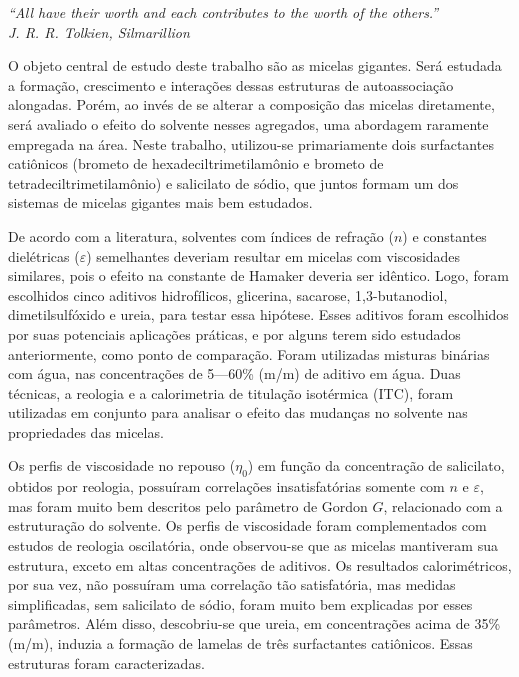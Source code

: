 \documentclass[
	12pt,				%
	oneside,
	a4paper,			%
	english,			%
	brazil%
	]{abntex2}
\begin{document}
\begin{epigrafe}
    \vspace*{\fill}
	\begin{flushright}
		\textit{``All have their worth and each contributes to the worth of the others.'' \\ J. R. R. Tolkien, Silmarillion}
	\end{flushright}
\end{epigrafe}


\setlength{\absparsep}{18pt} %
\begin{resumo}
 	O objeto central de estudo deste trabalho são as micelas gigantes. Será estudada a formação, crescimento e interações dessas estruturas de autoassociação alongadas. Porém, ao invés de se alterar a composição das micelas diretamente, será avaliado o efeito do solvente nesses agregados, uma abordagem raramente empregada na área. Neste trabalho, utilizou-se primariamente dois surfactantes catiônicos (brometo de hexadeciltrimetilamônio e brometo de tetradeciltrimetilamônio) e salicilato de sódio, que juntos formam um dos sistemas de micelas gigantes mais bem estudados.
 	
	De acordo com a literatura, solventes com índices de refração (\(n\)) e constantes dielétricas (\(\varepsilon\)) semelhantes deveriam resultar em micelas com viscosidades similares, pois o efeito na constante de Hamaker deveria ser idêntico. Logo, foram escolhidos cinco aditivos hidrofílicos, glicerina, sacarose, 1,3-butanodiol, dimetilsulfóxido e ureia, para testar essa hipótese. Esses aditivos foram escolhidos por suas potenciais aplicações práticas, e por alguns terem sido estudados anteriormente, como ponto de comparação. Foram utilizadas misturas binárias com água, nas concentrações de 5---60\% (m/m) de aditivo em água. Duas técnicas, a reologia e a calorimetria de titulação isotérmica (ITC), foram utilizadas em conjunto para analisar o efeito das mudanças no solvente nas propriedades das micelas. 
	
	Os perfis de viscosidade no repouso (\(\eta_0\)) em função da concentração de salicilato, obtidos por reologia, possuíram correlações insatisfatórias somente com \(n\) e \(\varepsilon\), mas foram muito bem descritos pelo parâmetro de Gordon \(G\), relacionado com a estruturação do solvente. Os perfis de viscosidade foram complementados com estudos de reologia oscilatória, onde observou-se que as micelas mantiveram sua estrutura, exceto em altas concentrações de aditivos. Os resultados calorimétricos, por sua vez, não possuíram uma correlação tão satisfatória, mas medidas simplificadas, sem salicilato de sódio, foram muito bem explicadas por esses parâmetros. Além disso, descobriu-se que ureia, em concentrações acima de 35\% (m/m), induzia a formação de lamelas de três surfactantes catiônicos. Essas estruturas foram caracterizadas.
	

\end{resumo}
\end{document}
